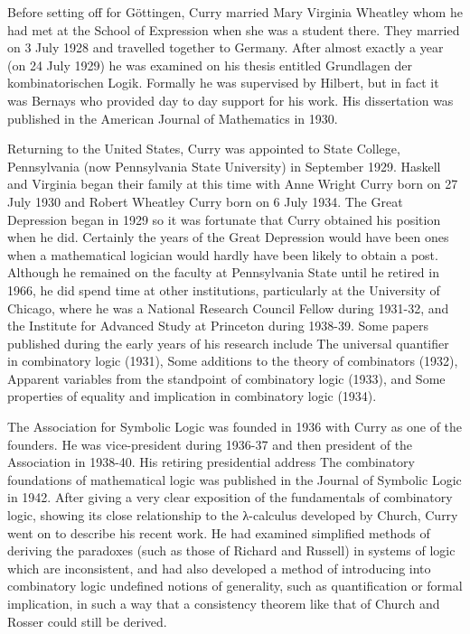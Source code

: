 Before setting off for Göttingen, Curry married Mary Virginia Wheatley whom he had met at the School of Expression when she was a student there. They married on 3 July 1928 and travelled together to Germany. After almost exactly a year (on 24 July 1929) he was examined on his thesis entitled Grundlagen der kombinatorischen Logik. Formally he was supervised by Hilbert, but in fact it was Bernays who provided day to day support for his work. His dissertation was published in the American Journal of Mathematics in 1930.

Returning to the United States, Curry was appointed to State College, Pennsylvania (now Pennsylvania State University) in September 1929. Haskell and Virginia began their family at this time with Anne Wright Curry born on 27 July 1930 and Robert Wheatley Curry born on 6 July 1934. The Great Depression began in 1929 so it was fortunate that Curry obtained his position when he did. Certainly the years of the Great Depression would have been ones when a mathematical logician would hardly have been likely to obtain a post. Although he remained on the faculty at Pennsylvania State until he retired in 1966, he did spend time at other institutions, particularly at the University of Chicago, where he was a National Research Council Fellow during 1931-32, and the Institute for Advanced Study at Princeton during 1938-39. Some papers published during the early years of his research include The universal quantifier in combinatory logic (1931), Some additions to the theory of combinators (1932), Apparent variables from the standpoint of combinatory logic (1933), and Some properties of equality and implication in combinatory logic (1934).

The Association for Symbolic Logic was founded in 1936 with Curry as one of the founders. He was vice-president during 1936-37 and then president of the Association in 1938-40. His retiring presidential address The combinatory foundations of mathematical logic was published in the Journal of Symbolic Logic in 1942. After giving a very clear exposition of the fundamentals of combinatory logic, showing its close relationship to the λ-calculus developed by Church, Curry went on to describe his recent work. He had examined simplified methods of deriving the paradoxes (such as those of Richard and Russell) in systems of logic which are inconsistent, and had also developed a method of introducing into combinatory logic undefined notions of generality, such as quantification or formal implication, in such a way that a consistency theorem like that of Church and Rosser could still be derived.

